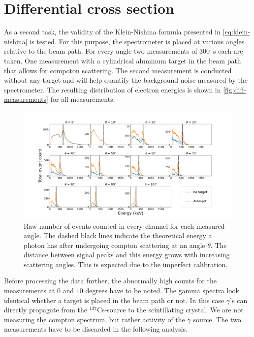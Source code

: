 
\section{Differential cross section}
\label{sec:differential-cross-section}

As a second task, the validity of the Klein-Nishina formula presented in
\autoref{eq:klein-nishina} is tested. For this purpose, the spectrometer is placed 
at various angles relative to the beam path. For every angle two measurements of 
\SI{300}{\second} each are taken. One measurement with a cylindrical aluminum target 
in the beam path that allows for compoton scattering. The second measurement is 
conducted without any target and will help quantify the background noise measured 
by the spectrometer. The resulting distribution of electron energies is shown in 
\autoref{fig:diff-measurements} for all measurements.

\begin{figure}
  \includegraphics[width=1.0\textwidth]{./fig/differential measurements.png}
\caption{Raw number of events counted in every channel for each measured angle.
  The dashed black lines indicate the theoretical energy a photon has after
  undergoing compton scattering at an angle $\theta$. The distance between signal
  peaks and this energy grows with increasing scattering angles. This is expected
  due to the imperfect calibration.}\label{fig:diff-measurements}
\end{figure}

Before processing the data further, the abnormally high counts for the measurements
at $0$ and $10$ degrees have to be noted. The gamma spectra look identical whether a 
target is placed in the beam path or not. In this case $\gamma$'s can directly 
propagate from the $^{137}$Cs-source to the scintillating crystal. We are not
measuring the compton spectrum, but rather activity of the $\gamma$ source. The two
measurements have to be discarded in the following analysis.

